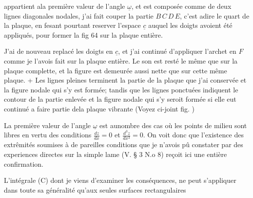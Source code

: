 \documentclass[11pt,a4paper]{article}
\begin{document}

appartient ala première valeur de l'angle $\underline{\omega}$, et est composée
comme  de deux lignes diagonales nodales, j'ai fait  couper la
partie $B\,C\,D\,E$, c'est adire le quart de la plaque, en fesant
pourtant reserver l'espace $\underline{c}$ auquel les doigts avoient été
appliqués, pour former la fig 64 sur la plaque entière.

J'ai de nouveau replacé les doigts en $\underline{c}$, et j'ai continué
 d'appliquer l'archet en $F$ comme je l'avois
fait sur la plaque entière. Le son est resté le même
que sur la plaque complette, et la figure est demeurée
aussi nette que sur cette même plaque.  +  Les lignes pleines terminent
la partie de la plaque que j'ai conservée  et la
figure nodale qui s'y est formée; tandis que les lignes ponctuées
indiquent le contour de la partie enlevée et la figure
nodale qui s'y seroit formée si elle eut continué a
faire partie dela plaque vibrante (Voyez ci-joint fig. )

La première valeur de l'angle $\underline{\omega}$ est aunombre des cas où
les points de milieu sont libres en vertu des conditions
$\frac{dz}{dx}=0$ et $\frac{d^3z}{dx^3}=0$. On voit donc que l'existence des extrêmités
soumises à de pareilles conditions que je n'avois pû
constater par des experiences directes sur la simple lame
(V. § 3 N.o 8) reçoit ici une entière confirmation.

L'intégrale (C) dont je viens d'examiner les conséquences, ne peut
s'appliquer dans toute sa généralité qu'aux seules surfaces rectangulaires
\end{document}
